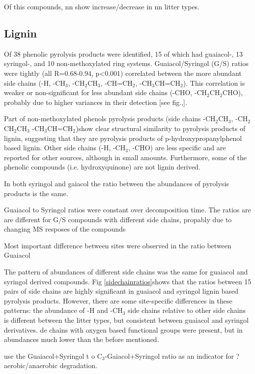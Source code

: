\documentclass[preprint,review,12pt]{elsarticle}
\begin{document}
Of this compounds, nn show increase/decrease in nn litter types.

\subsection{Lignin}
Of 38 phenolic pyrolysis products were identified, 15 of which had guaiacol-, 13 syringol-, and 10 non-methoxylated ring systems. Guaiacol/Syringol (G/S) ratios were tightly (all R=0.68-0.94, p<0.001) correlated between the more abundant side chains (-H, -CH$_3$, -CH$_2$CH$_3$, -CH=CH$_2$, -CH$_3$CH=CH$_2$). This correlation is weaker or non-significant for less abundant side chains (-CHO, -CH$_2$CH$_2$CHO), probably due to higher variances in their detection [see fig.,]. 

Part of non-methoxylated phenols pyrolysis products (side chains -CH$_2$CH$_3$, -CH$_2$CH$_2$CH$_3$ -CH$_3$CH=CH$_2$)show clear structural similarity to pyrolysis products of lignin, suggesting that they are pyrolysis products of p-hydroxypropanylphenol based lignin. Other side chains (-H, -CH$_3$, -CHO) are less specific and are reported for other sources, although in small amounts. Furthermore, some of the phenolic compounds (i.e. hydroxyquinone) are not lignin derived. 

In both syringol and gaiacol the ratio between the abundances of pyrolysis products is the same.

Guaiacol to Syringol ratios were constant over decomposition time. The ratios are are different for G/S compounds with different side chains, propably due to changing MS resposes of the compounds 

Most important difference between sites were observed in the ratio between Guaiacol

The pattern of abundances of different side chains was the same for guaiacol and syringol derived compounds. Fig \ref{sidechainratios}shows that the ratios between 15 pairs of side chains are highly significant in guaiacol and syringol lignin based pyrolysis products. However, there are some site-specific differences in these patterns: the abundance of -H and -CH$_3$ side chains relative to other side chains is different between the litter types, but consistent between guaiacol and syringol derivatives. 
  de chains with oxygen based functional groups were present, but in abundances much lower than the before mentioned. 

\cite{Kuder1998, Schellekens2009} use the Guaiacol+Syringol t o C$_3$-Gaiacol+Syringol ratio as an indicator for ?aerobic/anaerobic degradation. 
\end{document}

